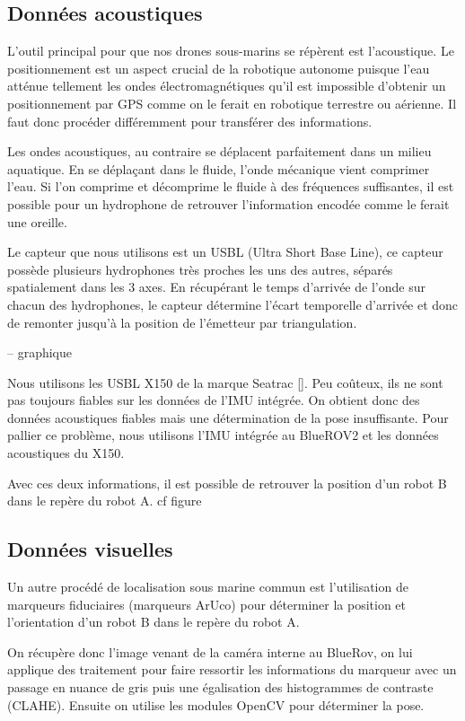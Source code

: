 \documentclass[twocolumn]{article}
\begin{document}
\subsection{Données acoustiques}


L'outil principal pour que nos drones sous-marins se répèrent est l'acoustique. Le positionnement est un aspect crucial de la robotique autonome puisque l'eau atténue tellement les ondes électromagnétiques qu'il est impossible d'obtenir un positionnement par GPS comme on le ferait en robotique terrestre ou aérienne. Il faut donc procéder différemment pour transférer des informations. 

Les ondes acoustiques, au contraire se déplacent parfaitement dans un milieu aquatique. En se déplaçant dans le fluide, l'onde mécanique vient comprimer l'eau. Si l'on comprime et décomprime le fluide à des fréquences suffisantes, il est possible pour un hydrophone de retrouver l'information encodée comme le ferait une oreille. 

Le capteur que nous utilisons est un USBL (Ultra Short Base Line), ce capteur possède plusieurs hydrophones très proches les uns des autres, séparés spatialement dans les 3 axes. En récupérant le temps d'arrivée de l'onde sur chacun des hydrophones, le capteur détermine l'écart temporelle d'arrivée et donc de remonter jusqu'à la position de l'émetteur par triangulation. 

-- graphique


Nous utilisons les USBL X150 de la marque Seatrac []. Peu coûteux, ils ne sont pas toujours fiables sur les données de l'IMU intégrée. On obtient donc des données acoustiques fiables mais une détermination de la pose insuffisante. Pour pallier ce problème, nous utilisons l'IMU intégrée au BlueROV2 et les données acoustiques du X150. 

Avec ces deux informations, il est possible de retrouver la position d'un robot B dans le repère du robot A. cf figure

\subsection{Données visuelles}
Un autre procédé de localisation sous marine commun est l'utilisation de marqueurs fiduciaires (marqueurs ArUco) pour déterminer la position et l'orientation d'un robot B dans le repère du robot A. 

On récupère donc l'image venant de la caméra interne au BlueRov, on lui applique des  traitement pour faire ressortir les informations du marqueur avec un passage en nuance de gris puis une égalisation des histogrammes de contraste (CLAHE). Ensuite on utilise les modules OpenCV pour déterminer la pose. 
\end{document}
